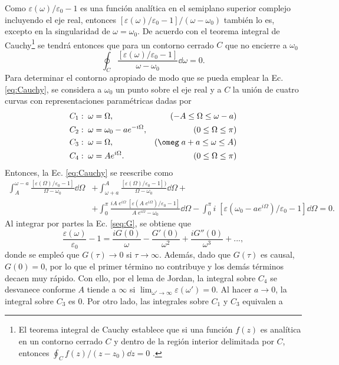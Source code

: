 Como $	\varepsilon(\omega)/\varepsilon_0-1$ es una función analítica en el semiplano superior complejo incluyendo el eje real, entonces $	[\varepsilon(\omega)/\varepsilon_0-1]/(\omega-\omega_0)$ también lo es, excepto en la singularidad de $\omega=\omega_0$. De acuerdo con el teorema integral de Cauchy\footnote{El teorema integral de Cauchy establece que si una función $f(z)$ es analítica en un contorno cerrado $C$ y dentro de la región interior delimitada por $C$, entonces $\oint_C f(z)/(z-z_0)\dd{z}= 0$ \cite{arfkenMathematicalMethodsPhysicists2011a}.} se tendrá entonces que para un contorno cerrado $C$ que no encierre a $\omega_0$ \cite{arfkenMathematicalMethodsPhysicists2011a}
%
\begin{equation}
	\oint_C \frac{[\varepsilon(\omega)/\varepsilon_0-1]}{\omega-\omega_0}\dd{\omega}= 0.
	\label{eq:Cauchy}
\end{equation}
%
Para determinar el contorno apropiado de modo que se pueda emplear la Ec. \eqref{eq:Cauchy}, se considera a $\omega_0$ un punto sobre el eje real y a $C$ la unión de cuatro curvas con representaciones paramétricas dadas por
%
\begin{align*}
	C_1&: \; \omega=\Omega, & (-A\leq \Omega \leq \omega-a)\\
	C_2&: \; \omega=\omega_0-ae^{-i\Omega}, & (0\leq\Omega\leq\pi)\\
	C_3&: \;\omega=\Omega, & (\omeg\;a+a\leq\omega\leq A)\\
	C_4&: \;\omega=Ae^{i\Omega}. & (0\leq\Omega\leq \pi)	
\end{align*}
%
Entonces, la Ec. \eqref{eq:Cauchy} se reescribe como
\begin{align*}
	\int_A^{\omega-a}\frac{[\varepsilon(\Omega)/\varepsilon_0-1]}{\Omega-\omega_0}\dd{\Omega}&+	\int_{\omega+a}^{A}\frac{[\varepsilon(\Omega)/\varepsilon_0-1])}{\Omega-\omega_0}\dd{\Omega}+\\
	&+	\int_0^{\pi}\frac{iA\;e^{i\Omega}\; [\varepsilon(A\;e^{i\Omega})/\varepsilon_0-1]}{A\;e^{i\Omega}-\omega_0}\dd{\Omega}-\int_0^{\pi}i\;[\varepsilon(\omega_0-ae^{i\Omega})/\varepsilon_0-1]\dd{\Omega}=0.
\end{align*}
Al integrar por partes la Ec. \eqref{seq:G}, se obtiene que 
%
\begin{equation*}
	\frac{\varepsilon(\omega)}{\varepsilon_0}-1=\frac{i G(0)}{\omega}-\frac{ G'(0)}{\omega^2}+\frac{i G''(0)}{\omega^3}+...,
\end{equation*}
%
donde se empleó que $G(\tau)\rightarrow 0$ si $\tau\rightarrow \infty$. Además, dado que $G(\tau)$ es causal, $G(0)=0$, por lo que el primer término no contribuye y los demás términos decaen muy rápido. Con ello, por el lema de Jordan, la integral sobre $C_4$ se desvanece conforme $A$ tiende a $\infty$ si $\lim_{\omega'\to\infty} \varepsilon(\omega')=0$. Al hacer $a\to 0$, la integral sobre $C_3$ es 0. Por otro lado, las integrales sobre $C_1$ y $C_3$ equivalen a 
